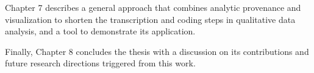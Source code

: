 Chapter 7 describes a general approach that combines analytic provenance and visualization to shorten the transcription and coding steps in qualitative data analysis, and a tool to demonstrate its application.

Finally, Chapter 8 concludes the thesis with a discussion on its contributions and future research directions triggered from this work.



%
%
%
%
%
%
